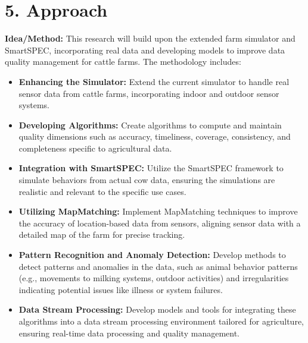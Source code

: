 \documentclass[12pt]{article}
\begin{document}
\section*{5. Approach}
\textbf{Idea/Method:} This research will build upon the extended farm simulator and SmartSPEC, incorporating real data and developing models to improve data quality management for cattle farms. The methodology includes:
\begin{itemize}
    \item \textbf{Enhancing the Simulator:} Extend the current simulator to handle real sensor data from cattle farms, incorporating indoor and outdoor sensor systems.
    \item \textbf{Developing Algorithms:} Create algorithms to compute and maintain quality dimensions such as accuracy, timeliness, coverage, consistency, and completeness specific to agricultural data.
    \item \textbf{Integration with SmartSPEC:} Utilize the SmartSPEC framework to simulate behaviors from actual cow data, ensuring the simulations are realistic and relevant to the specific use cases.
    \item \textbf{Utilizing MapMatching:} Implement MapMatching techniques to improve the accuracy of location-based data from sensors, aligning sensor data with a detailed map of the farm for precise tracking.
    \item \textbf{Pattern Recognition and Anomaly Detection:} Develop methods to detect patterns and anomalies in the data, such as animal behavior patterns (e.g., movements to milking systems, outdoor activities) and irregularities indicating potential issues like illness or system failures.
    \item \textbf{Data Stream Processing:} Develop models and tools for integrating these algorithms into a data stream processing environment tailored for agriculture, ensuring real-time data processing and quality management.
\end{itemize}
\end{document}
